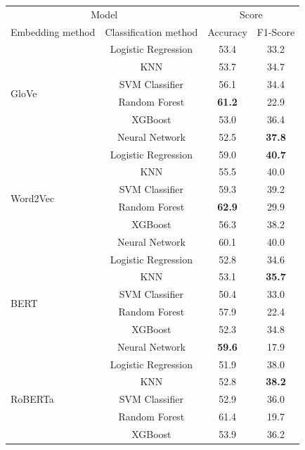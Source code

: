 \begin{table}[htb]
\centering
\begin{tabular}{l|c|c|c}
\hline


\multicolumn{2}{c|}{Model} & \multicolumn{2}{c}{Score} \\
\cline{1-4}
Embedding method & Classification method & Accuracy & F1-Score\\

\hline
\multirow{6}{*}{GloVe}
    & Logistic Regression & 53.4 & 33.2 \\
    & KNN & 53.7 & 34.7 \\
    & SVM Classifier & 56.1 & 34.4 \\
    & Random Forest & \textbf{61.2} & 22.9 \\
    & XGBoost & 53.0 & 36.4 \\
    & Neural Network & 52.5 & \textbf{37.8} \\
\hline
\multirow{6}{*}{Word2Vec}
    & Logistic Regression & 59.0 & \textbf{40.7} \\
    & KNN & 55.5 & 40.0 \\
    & SVM Classifier & 59.3 & 39.2 \\
    & Random Forest & \textbf{62.9} & 29.9 \\
    & XGBoost & 56.3 & 38.2 \\
    & Neural Network & 60.1 & 40.0 \\
\hline
\multirow{6}{*}{BERT} 
    & Logistic Regression & 52.8 & 34.6 \\
    & KNN & 53.1 & \textbf{35.7} \\
    & SVM Classifier & 50.4 & 33.0   \\
    & Random Forest & 57.9 & 22.4 \\
    & XGBoost & 52.3 & 34.8 \\
    & Neural Network & \textbf{59.6} & 17.9 \\
\hline
\multirow{6}{*}{RoBERTa} 
    & Logistic Regression & 51.9 & 38.0 \\
    & KNN & 52.8 & \textbf{38.2} \\
    & SVM Classifier & 52.9 & 36.0 \\
    & Random Forest & 61.4 & 19.7 \\
    & XGBoost & 53.9 & 36.2 \\

\end{tabular}
\end{table}
